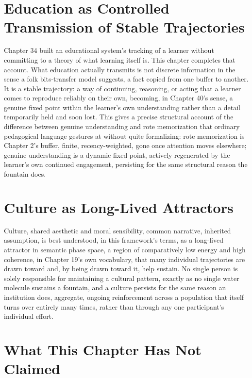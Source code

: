 \section{Education as Controlled Transmission of Stable Trajectories}

Chapter 34 built an educational system's tracking of a learner without committing to a theory of what learning itself is. This chapter completes that account. What education actually transmits is not discrete information in the sense a folk bits-transfer model suggests, a fact copied from one buffer to another. It is a stable trajectory: a way of continuing, reasoning, or acting that a learner comes to reproduce reliably on their own, becoming, in Chapter 40's sense, a genuine fixed point within the learner's own understanding rather than a detail temporarily held and soon lost. This gives a precise structural account of the difference between genuine understanding and rote memorization that ordinary pedagogical language gestures at without quite formalizing: rote memorization is Chapter 2's buffer, finite, recency-weighted, gone once attention moves elsewhere; genuine understanding is a dynamic fixed point, actively regenerated by the learner's own continued engagement, persisting for the same structural reason the fountain does.

\section{Culture as Long-Lived Attractors}

Culture, shared aesthetic and moral sensibility, common narrative, inherited assumption, is best understood, in this framework's terms, as a long-lived attractor in semantic phase space, a region of comparatively low energy and high coherence, in Chapter 19's own vocabulary, that many individual trajectories are drawn toward and, by being drawn toward it, help sustain. No single person is solely responsible for maintaining a cultural pattern, exactly as no single water molecule sustains a fountain, and a culture persists for the same reason an institution does, aggregate, ongoing reinforcement across a population that itself turns over entirely many times, rather than through any one participant's individual effort.

\section{What This Chapter Has Not Claimed}

